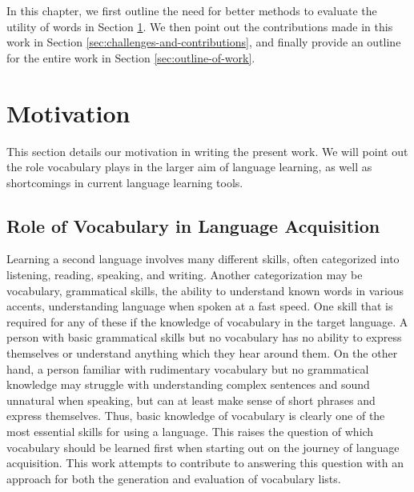 In this chapter, we first outline the need for better methods to evaluate the utility of words in Section \ref{sec:motivation}.
We then point out the contributions made in this work in Section \ref{sec:challenges-and-contributions}, and finally provide an outline for the entire work in Section \ref{sec:outline-of-work}.


\section{Motivation} \label{sec:motivation}
This section details our motivation in writing the present work.
We will point out the role vocabulary plays in the larger aim of language learning, as well as shortcomings in current language learning tools.

\subsection{Role of Vocabulary in Language Acquisition}
Learning a second language involves many different skills, often categorized into listening, reading, speaking, and writing.
Another categorization may be vocabulary, grammatical skills, the ability to understand known words in various accents, understanding language when spoken at a fast speed.
One skill that is required for any of these if the knowledge of vocabulary in the target language.
A person with basic grammatical skills but no vocabulary has no ability to express themselves or understand anything which they hear around them.
On the other hand, a person familiar with rudimentary vocabulary but no grammatical knowledge may struggle with understanding complex sentences and sound unnatural when speaking, but can at least make sense of short phrases and express themselves.
Thus, basic knowledge of vocabulary is clearly one of the most essential skills for using a language.
This raises the question of which vocabulary should be learned first when starting out on the journey of language acquisition.
This work attempts to contribute to answering this question with an approach for both the generation and evaluation of vocabulary lists.

